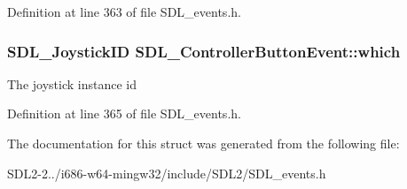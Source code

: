 Definition at line 363 of file S\+D\+L\+\_\+events.\+h.

\hypertarget{structSDL__ControllerButtonEvent_a98777e88b5d5cae83eef16ffd4bcacc1}{
\subsubsection[{which}]{\setlength{\rightskip}{0pt plus 5cm}S\+D\+L\+\_\+\+Joystick\+I\+D S\+D\+L\+\_\+\+Controller\+Button\+Event\+::which}}\label{structSDL__ControllerButtonEvent_a98777e88b5d5cae83eef16ffd4bcacc1}
The joystick instance id 

Definition at line 365 of file S\+D\+L\+\_\+events.\+h.



The documentation for this struct was generated from the following file\+:\begin{DoxyCompactItemize}
\item 
S\+D\+L2-\/2../i686-\/w64-\/mingw32/include/\+S\+D\+L2/S\+D\+L\+\_\+events.\+h\end{DoxyCompactItemize}
